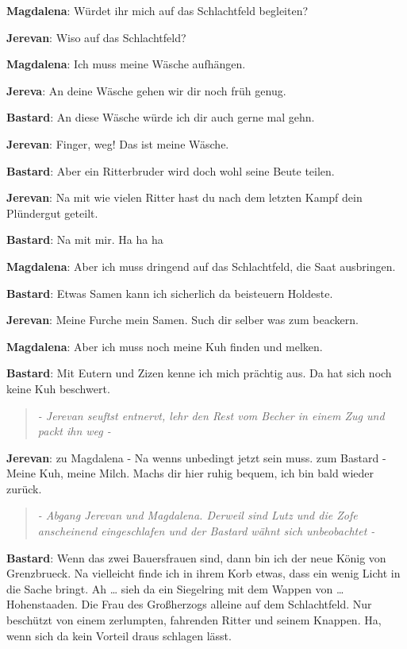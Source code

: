 \documentclass[a5paper,7pt, twocolumn]{book}
\begin{document}
\textbf{Magdalena}: Würdet ihr mich auf das Schlachtfeld begleiten?

\textbf{Jerevan}: Wiso auf das Schlachtfeld?

\textbf{Magdalena}: Ich muss meine Wäsche aufhängen.

\textbf{Jereva}: An deine Wäsche gehen wir dir noch früh genug.

\textbf{Bastard}: An diese Wäsche würde ich dir auch gerne mal gehn.

\textbf{Jerevan}: Finger, weg! Das ist meine Wäsche.

\textbf{Bastard}: Aber ein Ritterbruder wird doch wohl seine Beute teilen.

\textbf{Jerevan}: Na mit wie vielen Ritter hast du nach dem letzten Kampf dein Plündergut geteilt.

\textbf{Bastard}: Na mit mir. Ha ha ha

\textbf{Magdalena}: Aber ich muss dringend auf das Schlachtfeld, die Saat ausbringen.

\textbf{Bastard}: Etwas Samen kann ich sicherlich da beisteuern Holdeste.

\textbf{Jerevan}: Meine Furche mein Samen. Such dir selber was zum beackern.

\textbf{Magdalena}: Aber ich muss noch meine Kuh finden und melken.

\textbf{Bastard}: Mit Eutern und Zizen kenne ich mich prächtig aus. Da hat sich noch keine Kuh beschwert.

\begin{quote}
  \textit{- Jerevan seuftst entnervt, lehr den Rest vom Becher in einem Zug und packt ihn weg -}
 \end{quote}


\textbf{Jerevan}:
zu Magdalena - Na wenns unbedingt jetzt sein muss.
zum Bastard - Meine Kuh, meine Milch. Machs dir hier ruhig bequem, ich bin bald wieder zurück.


\begin{quote}
  \textit{- Abgang Jerevan und Magdalena. Derweil sind Lutz und die Zofe anscheinend eingeschlafen und der Bastard wähnt sich unbeobachtet -}
 \end{quote}


\textbf{Bastard}: Wenn das zwei Bauersfrauen sind, dann bin ich der neue König von Grenzbrueck.
Na vielleicht finde ich in ihrem Korb etwas, dass ein wenig Licht in die Sache bringt.
Ah … sieh da ein Siegelring mit dem Wappen von … Hohenstaaden. Die Frau des Großherzogs alleine auf dem Schlachtfeld. Nur beschützt von einem zerlumpten, fahrenden Ritter und seinem Knappen. Ha, wenn sich da kein Vorteil draus schlagen lässt.
\end{document}
